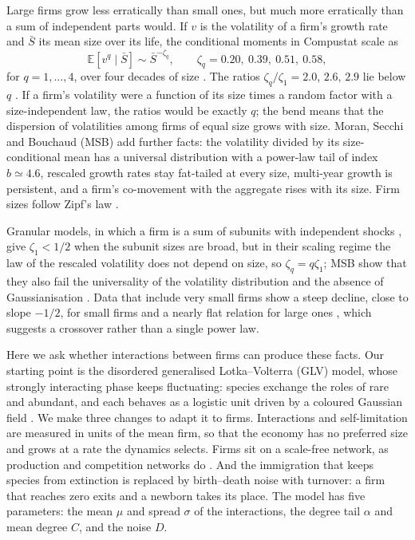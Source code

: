 \documentclass[pre,twocolumn,superscriptaddress,nofootinbib]{revtex4-2}
\newcommand{\E}{\mathbb E}
\newcommand{\Sb}{\bar S}
\begin{document}
Large firms grow less erratically than small ones, but much more erratically than a sum of
independent parts would.  If $v$ is the volatility of a firm's growth rate and $\Sb$ its mean size
over its life, the conditional moments in Compustat scale as
\begin{equation}
\E[v^q\mid\Sb]\sim\Sb^{-\zeta_q},\qquad \zeta_q=0.20,\ 0.39,\ 0.51,\ 0.58,
\label{eq:zeta}
\end{equation}
for $q=1,\dots,4$,
over four decades of size \cite{stanley1996,amaral1997,sutton2002,moran2024}.  The ratios
$\zeta_q/\zeta_1=2.0$, $2.6$, $2.9$ lie below $q$ \cite{moran2024}.  If a firm's volatility were a
function of its size times a random factor with a size-independent law, the ratios would be exactly
$q$; the bend means that the dispersion of volatilities among firms of equal size grows with size.
Moran, Secchi and Bouchaud \cite{moran2024} (MSB) add further facts: the volatility divided by its
size-conditional mean has a universal distribution with a power-law tail of index $b\simeq4.6$,
rescaled growth rates stay fat-tailed at every size, multi-year growth is persistent, and a firm's
co-movement with the aggregate rises with its size.  Firm sizes follow Zipf's law \cite{axtell2001}.

Granular models, in which a firm is a sum of subunits with independent shocks
\cite{wyartbouchaud2003,gabaix2011}, give $\zeta_1<1/2$ when the subunit sizes are broad, but in
their scaling regime the law of the rescaled volatility does not depend on size, so
$\zeta_q=q\zeta_1$; MSB show that they also fail the universality of the volatility distribution and
the absence of Gaussianisation \cite{moran2024}.  Data that include very small firms show a steep
decline, close to slope $-1/2$, for small firms and a nearly flat relation for large ones
\cite{fontanelli2025}, which suggests a crossover rather than a single power law.

Here we ask whether interactions between firms can produce these facts.  Our starting point is the
disordered generalised Lotka--Volterra (GLV) model, whose strongly interacting phase keeps
fluctuating: species exchange the roles of rare and abundant, and each behaves as a logistic unit
driven by a coloured Gaussian field \cite{roy2020,mallmin2024,arnouxbunin2024}.  We make three
changes to adapt it to firms.  Interactions and self-limitation are measured in units of the mean
firm, so that the economy has no preferred size and grows at a rate the dynamics selects.  Firms
sit on a scale-free network, as production and competition networks do
\cite{acemoglu2012,carvalho2019}.  And the immigration that keeps species from extinction is
replaced by birth--death noise with turnover: a firm that reaches zero exits and a newborn takes its
place.  The model has five parameters: the mean $\mu$ and spread $\sigma$ of the interactions, the
degree tail $\alpha$ and mean degree $C$, and the noise $D$.
\end{document}
